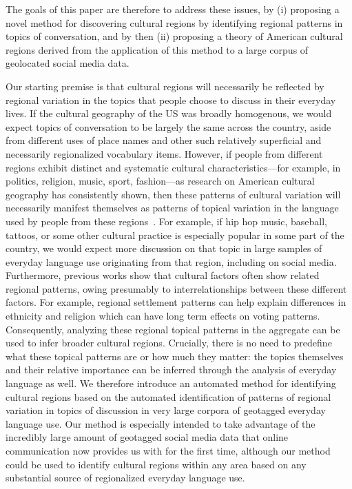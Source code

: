 \documentclass[../thesis.tex]{subfiles}
\begin{document}
The goals of this paper are therefore to address these issues, by (i) proposing a novel
method for discovering cultural regions by identifying regional patterns in topics of
conversation, and by then (ii) proposing a theory of American cultural regions derived
from the application of this method to a large corpus of geolocated social media data.

Our starting premise is that cultural regions will necessarily be reflected by regional
variation in the topics that people choose to discuss in their everyday lives. If the
cultural geography of the US was broadly homogenous, we would expect topics of
conversation to be largely the same across the country, aside from different uses of
place names and other such relatively superficial and necessarily regionalized
vocabulary items. However, if  people from different regions exhibit distinct and
systematic cultural characteristics—for example, in politics, religion, music, sport,
fashion—as research on American cultural geography has consistently shown, then these
patterns of cultural variation will necessarily manifest themselves as patterns of
topical variation in the language used by people from these
regions~\cite{kramsch2014language}. For example, if hip hop music,  baseball, tattoos,
or some other cultural practice is especially popular in some part of the country, we
would expect more discussion on that topic in large samples of everyday language use
originating from that region, including on social media. Furthermore, previous works
show that cultural factors often show related regional patterns, owing presumably to
interrelationships between these different factors. For example, regional settlement
patterns can help explain differences in ethnicity and religion which can have long term
effects on voting patterns. Consequently, analyzing these regional topical patterns in
the aggregate can be used to infer broader cultural regions. Crucially, there is no need
to predefine what these topical patterns are or how much they matter: the topics
themselves and their relative importance can be inferred through the analysis of
everyday language as well. We therefore introduce an automated method for identifying
cultural regions based on the automated identification of patterns of regional variation
in topics of discussion in very large corpora of geotagged everyday language use. Our
method is especially intended to take advantage of the incredibly large amount of
geotagged social media data that online communication now provides us with for the first
time, although our method could be used to identify cultural regions within any area
based on any substantial source of regionalized everyday language use.
\end{document}
